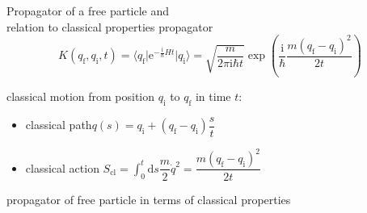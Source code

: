 \documentclass[t,dvipsnames]{beamer}
\begin{document}
\begin{frame}[c]{Propagator of a free particle and\\ relation to classical properties}
 propagator 
 \begin{displaymath}
  K(q_\text{f}, q_\text{i}, t) = \langle q_\text{f}\vert\text{e}^{-\frac{\text{i}}{\hbar}Ht}
                                   \vert q_\text{i}\rangle
     = \sqrt{\frac{m}{2\pi\text{i}\hbar t}}\exp\left(\frac{\text{i}}{\hbar}
	    \frac{m(q_\text{f}-q_\text{i})^2}{2t}\right)
 \end{displaymath}

 \vspace{0.3truecm}
 classical motion from position $q_\text{i}$ to $q_\text{f}$ in time $t$:
 \begin{itemize}
  \item classical path\quad $q(s) = q_\text{i} + (q_\text{f}-q_\text{i})\dfrac{s}{t}$
  \item classical action\quad
	$S_\text{cl} = \int_0^t\text{d}s\dfrac{m}{2}\dot q^2
		     = \dfrac{m(q_\text{f}-q_\text{i})^2}{2t}$
 \end{itemize}

 \vspace{0.4truecm}
 propagator of free particle in terms of classical properties

 \begin{center}
 \end{center}
\end{frame}
\end{document}
